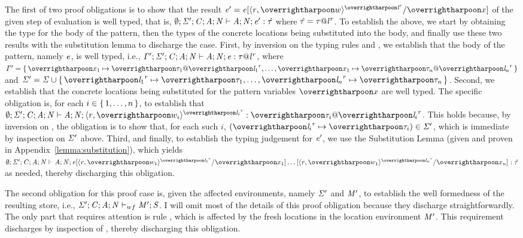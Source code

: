 \begin{nproof}
    The first of two proof obligations is to show that
    the result $\EXPR' = \subst{\EXPR}{\overharpoon{\var}}{\concreteloc{\reg}{\overharpoon{w}}{\overharpoon{\locreg{\loc}{\reg}}}}$ of
    the given step of evaluation is well typed, that is,
    $\emptyset;\mathit{\Sigma}';\mathit{C};\mathit{A};\mathit{N} \vdash \mathit{A}; \mathit{N}; \mathit{e}' : \mathit{\hat{\tau}}$
    where $\mathit{\hat{\tau}} = \mathit{\tau} @ {\mathit{l}}^{\mathit{r}}$.
    To establish the above, we start by obtaining the type
    for the body of the pattern, then the types of the
    concrete locations being substituted into the body,
    and finally use these two results
    with the substitution lemma to discharge the case.
    First, by inversion on the typing rules \tcase{} and \tpat{}, we
    establish that the body of the pattern, namely $\mathit{e}$, is well typed, i.e.,
    $\mathit{\Gamma}';\mathit{\Sigma}';\mathit{C};\mathit{A};\mathit{N} \vdash \mathit{A};\mathit{N};\mathit{e} : \mathit{\tau} @ {\mathit{l}}^{\mathit{r}}$,
    where
    $
    \TENV' = \set{\overharpoon{\var_1} \mapsto \overharpoon{\TYP_1} \ensuremath{@} \overharpoon{\locreg{\loc_1}{\reg}}, \ldots, \overharpoon{\var_1} \mapsto \overharpoon{\TYP_n} \ensuremath{@} \overharpoon{\locreg{\loc_n}{\reg}}}$ and
    $\SENV' = \SENV \cup \set{\overharpoon{\locreg{\loc_1}{\reg}}\mapsto\overharpoon{\TYP}_1,\ldots,\overharpoon{\locreg{\loc_n}{\reg}}\mapsto\overharpoon{\TYP}_n}$.
    Second, we establish that the concrete locations being substituted for the
    pattern variables $\overharpoon{x}$ are well typed.
    The specific obligation is, for each $i \in \{ \, 1, \ldots, n \,\}$, to establish that
    $\emptyset;\SENV';\CENV;\AENV;\NENV \vdash \AENV;\NENV; \concreteloc{\reg}{\overharpoon{w_i}}{\overharpoon{\locreg{\loc_i}{\reg}}} : \overharpoon{\TYP}_i \ensuremath{@} \overharpoon{\locreg{\loc_i}{\reg}}$.
    This holds because, by inversion on \tconcreteloc{}, the obligation is
    to show that, for each such $i$, $(\locreg{\overharpoon{\loc_i}}{\reg} \mapsto \overharpoon{\TYP_i}) \in \SENV'$,
    which is immediate by inspection on $\mathit{\Sigma}'$ above.
    Third, and finally, to establish the typing judgement for $\mathit{e}'$, we use the Substitution
    Lemma (given and proven in Appendix~\ref{lemma:substitution}), which yields
    $\emptyset;\SENV';\CENV;\AENV;\NENV \vdash \AENV;\NENV; \subst{\EXPR}{\overharpoon{\var_1}}{\concreteloc{\reg}{\overharpoon{w_1}}{\overharpoon{\locreg{\loc_1}{\reg}}}}
    \ldots \subst{}{\overharpoon{\var_n}}{\concreteloc{\reg}{\overharpoon{w_1}}{\overharpoon{\locreg{\loc_n}{\reg}}}}: \hTYP$
    as needed, thereby discharging this obligation.
    \item The second obligation
    for this proof case is, given the affected environments, namely
    $\mathit{\Sigma}'$ and $\mathit{M}'$, to establish the well formedness
    of the resulting store, i.e.,
    $\mathit{\Sigma}';\mathit{C};\mathit{A};\mathit{N} \vdash_{wf} \mathit{M}';\mathit{S}$.
    I will omit most of the details of this proof obligation because they
    discharge straightforwardly.
    The only part that requires attention is rule
    ,
    which is affected by the fresh locations in the location
    environment $\mathit{M}'$.
    This requirement discharges by inspection of \dcase{}, thereby
    discharging this obligation.


\end{nproof}
